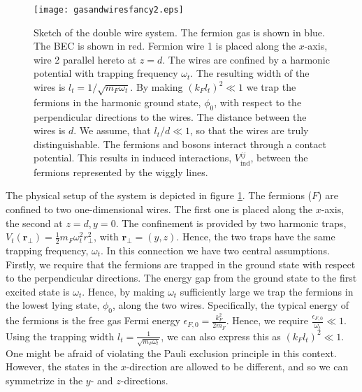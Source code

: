 \begin{figure} 
\begin{center}  
\texttt{[image: gasandwiresfancy2.eps]}  
\caption{Sketch of the double wire system. The fermion gas is shown in blue. The BEC is shown in red. Fermion wire 1 is placed along the $x$-axis, wire 2 parallel hereto at $z = d$. The wires are confined by a harmonic potential with trapping frequency $\omega_t$. The resulting width of the wires is $l_t = 1/\sqrt{m_F\omega_t}$. By making $(k_Fl_t)^2 \ll 1$ we trap the fermions in the harmonic ground state, $\phi_0$, with respect to the perpendicular directions to the wires. The distance between the wires is $d$. We assume, that $l_t / d \ll 1$, so that the wires are truly distinguishable. The fermions and bosons interact through a contact potential. This results in induced interactions, $V^{ij}_{\text{ind}}$, between the fermions represented by the wiggly lines.}  
\label{fig.gasandwires}  
\end{center}    
\end{figure}

The physical setup of the system is depicted in figure \ref{fig.gasandwires}. The fermions ($F$) are confined to two one-dimensional wires. The first one is placed along the $x$-axis, the second at $z = d, y = 0$. The confinement is provided by two harmonic traps, $V_t(\mathbf{r}_{\perp}) = \frac{1}{2}m_F\omega_t^2r_{\perp}^2$, with $\mathbf{r}_{\perp} = (y, z)$. Hence, the two traps have the same trapping frequency, $\omega_t$. In this connection we have two central assumptions. Firstly, we require that the fermions are trapped in the ground state with respect to the perpendicular directions. The energy gap from the ground state to the first excited state is $\omega_t$. Hence, by making $\omega_t$ sufficiently large we trap the fermions in the lowest lying state, $\phi_0$, along the two wires. Specifically, the typical energy of the fermions is the free gas Fermi energy $\epsilon_{F,0} = \frac{k_F^2}{2m_F}$. Hence, we require $\frac{\epsilon_{F,0}}{\omega_t} \ll 1$. Using the trapping width $l_t = \frac{1}{\sqrt{m_F\omega_t}}$, we can also express this as $(k_Fl_t)^2 \ll 1$. One might be afraid of violating the Pauli exclusion principle in this context. However, the states in the $x$-direction are allowed to be different, and so we can symmetrize in the $y$- and $z$-directions.

